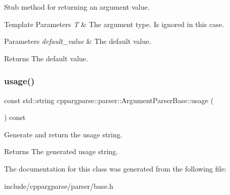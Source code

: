 Stub method for returning an argument value. 


\begin{DoxyTemplParams}{Template Parameters}
{\em T} & The argument type. Is ignored in this case.\\
\hline
\end{DoxyTemplParams}

\begin{DoxyParams}{Parameters}
{\em default\+\_\+value} & The default value.\\
\hline
\end{DoxyParams}
\begin{DoxyReturn}{Returns}
The default value. 
\end{DoxyReturn}
\mbox{\label{classcppargparse_1_1parser_1_1ArgumentParserBase_af99c2847a2cd19b1444dcb9ab2fb8103}} 
\subsubsection{\texorpdfstring{usage()}{usage()}}
{\footnotesize\ttfamily const std\+::string cppargparse\+::parser\+::\+Argument\+Parser\+Base\+::usage (\begin{DoxyParamCaption}{ }\end{DoxyParamCaption}) const\hspace{0.3cm}{\ttfamily [inline]}}



Generate and return the usage string. 

\begin{DoxyReturn}{Returns}
The generated usage string. 
\end{DoxyReturn}


The documentation for this class was generated from the following file\+:\begin{DoxyCompactItemize}
\item 
include/cppargparse/parser/base.\+h\end{DoxyCompactItemize}
